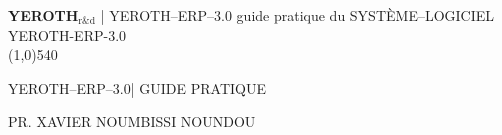 \documentclass[a4paper, 12pt]{report}
\newcommand{\yerothrd}{\textcolor{yerothColorGreen}
			{\textsc{\textcolor{yerothColorRed}{YEROTH}}$_{\text{r\&d}}$\xspace}}
\newcommand{\yerotherpblack}{YEROTH--ERP--$3.0$\xspace}
\newcommand{\myfullacademicname}{PR. XAVIER NOUMBISSI NOUNDOU\xspace}
\begin{document}
\thispagestyle{OnlyFirstPage}

{\bf \Large \yerothrd} {| \sc \scriptsize \yerotherpblack guide pratique du SYSTÈME--LOGICIEL YEROTH-ERP-3.0}
\\ \line(1,0){540}

\vspace{2.0em}

\begin{center}
{\LARGE \yerotherpblack | GUIDE PRATIQUE}
\end{center}

\vspace{2.0em}

\begin{center}
{\large \myfullacademicname}
\end{center}

\vspace{4.0em}



\begingroup
\tableofcontents
\endgroup

\begingroup
\color{medgreen}
\listoffigures
\endgroup

\begingroup
\color{medgreen}
\listoftables
\endgroup

\cleardoublepage





\cleardoublepage



\cleardoublepage
{}
\printindex

\cleardoublepage
{}
{}
\appendix

\end{document}

